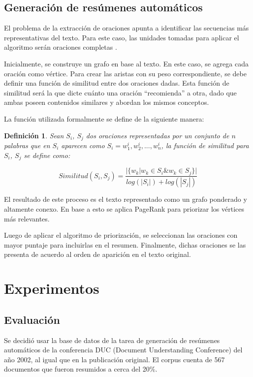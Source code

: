 \documentclass{llncs}
\newtheorem{definicion}{Definición}
\begin{document}
\subsection{Generación de resúmenes automáticos}
El problema de la extracción de oraciones apunta a identificar las secuencias más representativas del texto. Para este caso, las unidades tomadas para aplicar el algoritmo serán oraciones completas \cite{introductionir}.

Inicialmente, se construye un grafo en base al texto. En este caso, se agrega cada oración como vértice. Para crear las aristas con su peso correspondiente, se debe definir una función de similitud entre dos oraciones dadas. Esta función de similitud será la que dicte cuánto una oración “recomienda” a otra, dado que ambas poseen contenidos similares y abordan los mismos conceptos.
    
La función utilizada formalmente se define de la siguiente manera:


\begin{definicion}
Sean $S_i$, $S_j$ dos oraciones representadas por un conjunto de $n$ palabras que en 
$S_i$ aparecen como $S_i = w_{1}^{i}, w_{2}^{i},..., w_{n}^{i}$, la función de similitud para $S_i$, $S_j$ se define como:


\begin{equation}
Similitud(S_{i},S_{j}) = \frac{ | \{   w_{k} | w_{k} \in S_{i} \& w_{k} \in S_{j}   \}  | }    
                              {  log(|S_{i}|) + log(|S_{j}|)  }
\end{equation}


\end{definicion}
    
El resultado de este proceso es el texto representado como un grafo ponderado y altamente conexo. En base a esto se aplica PageRank para priorizar los vértices más relevantes.

Luego de aplicar el algoritmo de priorización, se seleccionan las oraciones con mayor puntaje para incluirlas en el resumen. Finalmente, dichas oraciones se las presenta de acuerdo al orden de aparición en el texto original.


\section{Experimentos}

\subsection{Evaluación}
Se decidió usar la base de datos de la tarea de generación de resúmenes automáticos de la conferencia DUC (Document Understanding Conference) del año 2002, al igual que en la publicación original. El corpus cuenta de 567 documentos que fueron resumidos a cerca del 20\%.
\end{document}
